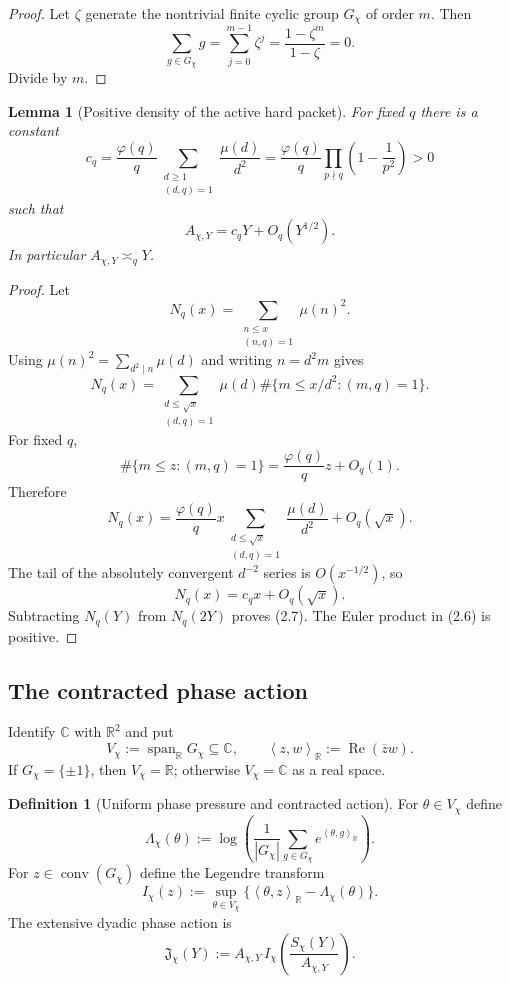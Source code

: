 \documentclass[11pt]{article}
\newtheorem{lemma}[theorem]{Lemma}
\theoremstyle{definition}
\newtheorem{definition}[theorem]{Definition}
\theoremstyle{remark}
\newcommand{\R}{\mathbb R}
\newcommand{\C}{\mathbb C}
\newcommand{\Span}{\operatorname{span}}
\newcommand{\conv}{\operatorname{conv}}
\newcommand{\ip}[2]{\left\langle#1,#2\right\rangle}
\begin{document}
\begin{proof}
Let $\zeta$ generate the nontrivial finite cyclic group $G_\chi$ of order $m$.
Then
\[
 \sum_{g\in G_\chi}g=\sum_{j=0}^{m-1}\zeta^j
 =\frac{1-\zeta^m}{1-\zeta}=0.
\]
Divide by $m$.
\end{proof}

\begin{lemma}[Positive density of the active hard packet]
\label{lem:active-density}
For fixed $q$ there is a constant
\[
 c_q
 =\frac{\varphi(q)}q
  \sum_{\substack{d\ge1\\(d,q)=1}}\frac{\mu(d)}{d^2}
 =\frac{\varphi(q)}q
  \prod_{p\nmid q}\left(1-\frac1{p^2}\right)>0
 \tag{2.6}
\]
such that
\[
 \boxed{A_{\chi,Y}=c_qY+O_q(Y^{1/2}).}
 \tag{2.7}
\]
In particular $A_{\chi,Y}\asymp_qY$.
\end{lemma}

\begin{proof}
Let
\[
 N_q(x)=\sum_{\substack{n\le x\\(n,q)=1}}\mu(n)^2.
\]
Using $\mu(n)^2=\sum_{d^2\mid n}\mu(d)$ and writing $n=d^2m$ gives
\[
 N_q(x)
 =\sum_{\substack{d\le\sqrt x\\(d,q)=1}}\mu(d)
   \#\{m\le x/d^2:(m,q)=1\}.
\]
For fixed $q$,
\[
 \#\{m\le z:(m,q)=1\}=\frac{\varphi(q)}qz+O_q(1).
\]
Therefore
\[
 N_q(x)
 =\frac{\varphi(q)}q x
  \sum_{\substack{d\le\sqrt x\\(d,q)=1}}\frac{\mu(d)}{d^2}
  +O_q(\sqrt x).
\]
The tail of the absolutely convergent $d^{-2}$ series is $O(x^{-1/2})$,
so
\[
 N_q(x)=c_qx+O_q(\sqrt x).
\]
Subtracting $N_q(Y)$ from $N_q(2Y)$ proves \textup{(2.7)}.  The Euler product
in \textup{(2.6)} is positive.
\end{proof}

\subsection{The contracted phase action}

Identify $\C$ with $\R^2$ and put
\[
 V_\chi:=\Span_\R G_\chi\subseteq\C,
 \qquad
 \ip{z}{w}_\R:=\operatorname{Re}(\overline zw).
\]
If $G_\chi=\{\pm1\}$, then $V_\chi=\R$; otherwise $V_\chi=\C$ as a real
space.

\begin{definition}[Uniform phase pressure and contracted action]
For $\theta\in V_\chi$ define
\[
 \Lambda_\chi(\theta)
 :=\log\left(
   \frac1{|G_\chi|}\sum_{g\in G_\chi}
   e^{\ip{\theta}{g}_\R}
 \right).
 \tag{2.8}
\]
For $z\in\conv(G_\chi)$ define the Legendre transform
\[
 \boxed{
 I_\chi(z)
 :=\sup_{\theta\in V_\chi}
 \{\ip{\theta}{z}_\R-\Lambda_\chi(\theta)\}.}
 \tag{2.9}
\]
The extensive dyadic phase action is
\[
 \boxed{
 \mathfrak J_\chi(Y)
 :=A_{\chi,Y}\,
 I_\chi\!\left(\frac{S_\chi(Y)}{A_{\chi,Y}}\right).}
 \tag{2.10}
\]
\end{definition}
\end{document}
